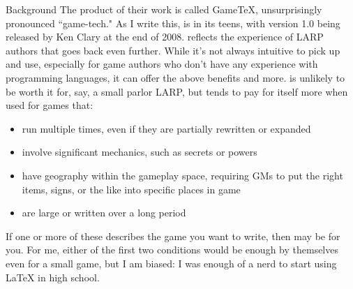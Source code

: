 \documentclass{article}
\begin{document}
\begin{section}{Background}
The product of their work is called GameTeX, unsurprisingly pronounced ``game-tech." As I write this, \gametex{} is in its teens, with version 1.0 being released by Ken Clary at the end of 2008.  \gametex{} reflects the experience of LARP authors that goes back even further.  While it's not always intuitive to pick up and use, especially for game authors who don't have any experience with programming languages, it can offer the above benefits and more.  \gametex{} is unlikely to be worth it for, say, a small parlor LARP, but tends to pay for itself more when used for games that:
\begin{itemize}
\item run multiple times, even if they are partially rewritten or expanded
\item involve significant mechanics, such as secrets or powers
\item have geography within the gameplay space, requiring GMs to put the right items, signs, or the like into specific places in game
\item are large or written over a long period
\end{itemize}

If one or more of these describes the game you want to write, then \gametex{} may be for you.  For me, either of the first two conditions would be enough by themselves even for a small game, but I am biased: I was enough of a nerd to start using \LaTeX{} in high school.
\end{section}
\end{document}
